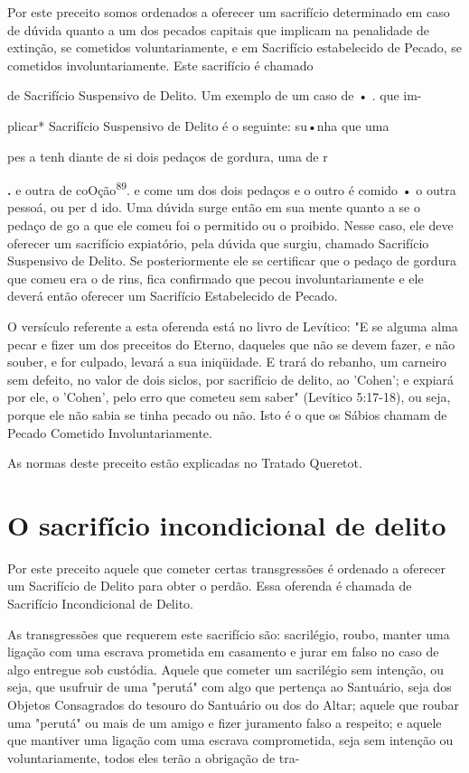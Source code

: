 \begin{itemize}
\begin{enumrate}
\begin{itemize}
\begin{itemize}
Por este preceito somos ordenados a oferecer um sacrifício determi­nado
em caso de dúvida quanto a um dos pecados capitais que implicam na
penalidade de extinção, se cometidos voluntariamente, e em Sacrifício
estabe­lecido de Pecado, se cometidos involuntariamente. Este sacrifício
é chamado

de Sacrifício Suspensivo de Delito. Um exemplo de um caso de • . que im-

plicar* Sacrifício Suspensivo de Delito é o seguinte: su•nha que uma

pes a tenh diante de si dois pedaços de gordura, uma de r

\textbf{.} e outra de coOção\textsuperscript{89}. e
come um dos dois pedaços e o outro é comido • o outra pes­soá, ou per d
ido. Uma dúvida surge então em sua mente quanto a se o pedaço de go a
que ele comeu foi o permitido ou o proibido. Nesse caso, ele deve
oferecer um sacrifício expiatório, pela dúvida que surgiu, chamado
Sacrifício Suspensivo de Delito. Se posteriormente ele se certificar que
o pedaço de gor­dura que comeu era o de rins, fica confirmado que pecou
involuntariamente e ele deverá então oferecer um Sacrifício Estabelecido
de Pecado.

O versículo referente a esta oferenda está no livro de Levítico: "E se
alguma alma pecar e fizer um dos preceitos do Eterno, daqueles que não
se devem fazer, e não souber, e for culpado, levará a sua iniqüidade. E
trará do rebanho, um carneiro sem defeito, no valor de dois siclos, por
sacrifício de de­lito, ao 'Cohen'; e expiará por ele, o 'Cohen', pelo
erro que cometeu sem sa­ber" (Levítico 5:17-18), ou seja, porque ele não
sabia se tinha pecado ou não. Isto é o que os Sábios chamam de Pecado
Cometido Involuntariamente.


As normas deste preceito estão explicadas no Tratado Queretot.


\section{O sacrifício incondicional de delito}

Por este preceito aquele que cometer certas transgressões é ordena­do a
oferecer um Sacrifício de Delito para obter o perdão. Essa oferenda é
cha­mada de Sacrifício Incondicional de Delito.

As transgressões que requerem este sacrifício são: sacrilégio, roubo,
manter uma ligação com uma escrava prometida em casamento e jurar em
falso no caso de algo entregue sob custódia. Aquele que cometer um
sacrilégio sem intenção, ou seja, que usufruir de uma "perutá" com algo
que pertença ao San­tuário, seja dos Objetos Consagrados do tesouro do
Santuário ou dos do Altar; aquele que roubar uma "perutá" ou mais de um
amigo e fizer juramento falso a respeito; e aquele que mantiver uma
ligação com uma escrava comprometi­da, seja sem intenção ou
voluntariamente, todos eles terão a obrigação de tra-



\end{itemize}
\end{itemize}
\end{enumrate}
\end{itemize}
